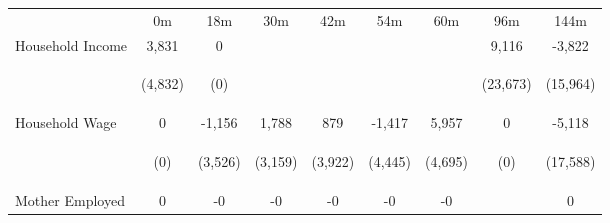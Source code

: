\begin{tabular}{lcccccccc}
\hline \noalign{\smallskip} & 0m & 18m & 30m & 42m & 54m & 60m & 96m & 144m\\
\noalign{\smallskip}\hline \noalign{\smallskip}Household Income & 3,831 & 0 &  &  &  &  & 9,116 & -3,822\\
 & \begin{footnotesize}(4,832)\end{footnotesize} & \begin{footnotesize}(0)\end{footnotesize} & \begin{footnotesize}\end{footnotesize} & \begin{footnotesize}\end{footnotesize} & \begin{footnotesize}\end{footnotesize} & \begin{footnotesize}\end{footnotesize} & \begin{footnotesize}(23,673)\end{footnotesize} & \begin{footnotesize}(15,964)\end{footnotesize}\\
\noalign{\smallskip}Household Wage & 0 & -1,156 & 1,788 & 879 & -1,417 & 5,957 & 0 & -5,118\\
 & \begin{footnotesize}(0)\end{footnotesize} & \begin{footnotesize}(3,526)\end{footnotesize} & \begin{footnotesize}(3,159)\end{footnotesize} & \begin{footnotesize}(3,922)\end{footnotesize} & \begin{footnotesize}(4,445)\end{footnotesize} & \begin{footnotesize}(4,695)\end{footnotesize} & \begin{footnotesize}(0)\end{footnotesize} & \begin{footnotesize}(17,588)\end{footnotesize}\\
\noalign{\smallskip}Mother Employed & 0 & -0 & -0 & -0 & -0 & -0 &  & 0\\

\end{tabular}
